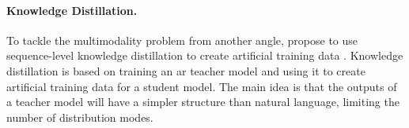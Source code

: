 

\paragraph{Knowledge Distillation.} To tackle the multimodality problem from
another angle, \citet{gu2017nonautoregressive} propose to use sequence-level
knowledge distillation to create artificial training data
\citep{kim-rush-2016-sequence}. Knowledge distillation is based on training an
\ac{ar} teacher model and using it to create artificial training data for a
student model. The main idea is that the outputs of a teacher model will have a
simpler structure than natural language, limiting the number of distribution
modes.

